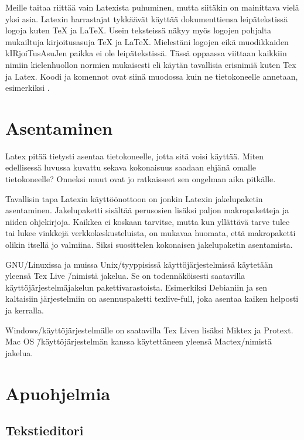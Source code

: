 Meille taitaa riittää vain Latexista puhuminen, mutta siitäkin on
mainittava vielä yksi asia. Latexin harrastajat tykkäävät käyttää
dokumenttiensa leipätekstissä logoja kuten \TeX{} ja \LaTeX{}. Usein
teksteissä näkyy myös logojen pohjalta mukailtuja kir\-joi\-tus\-asu\-ja
TeX ja LaTeX. Mielestäni logojen eikä muodikkaiden
kIR\-joi\-Tus\-Asu\-Jen paikka ei ole leipätekstissä. Tässä oppaassa
viittaan kaikkiin nimiin kielenhuollon normien mukaisesti eli käytän
tavallisia erisnimiä kuten Tex ja Latex. Koodi ja komennot ovat siinä
muodossa kuin ne tietokoneelle annetaan, esimerkiksi .

\section{Asentaminen}
\label{luku:asentaminen}

Latex pitää tietysti asentaa tietokoneelle, jotta sitä voisi käyttää.
Miten edellisessä luvussa kuvattu sekava kokonaisuus saadaan ehjänä
omalle tietokoneelle? Onneksi muut ovat jo ratkaisseet sen ongelman aika
pitkälle.

Tavallisin tapa Latexin käyttöön\-ottoon on jonkin Latexin jakelupaketin
asentaminen. Jakelupaketti sisältää perus\-osien lisäksi paljon
makropaketteja ja niiden ohjekirjoja. Kaikkea ei koskaan tarvitse, mutta
kun yllättävä tarve tulee tai lukee vinkkejä verkkokeskusteluista, on
mukavaa huomata, että makropaketti olikin itsellä jo valmiina. Siksi
suosittelen kokonaisen jakelupaketin asentamista.

GNU/Linuxissa ja muissa Unix\-/tyyppisissä käyttöjärjestelmissä
käytetään yleensä Tex Live \=/nimistä jakelua. Se on todennäköisesti
saatavilla käyttöjärjestelmäjakelun pakettivarastoista. Esimerkiksi
Debianiin ja sen kaltaisiin järjestelmiin on asennuspaketti
texlive-full, joka asentaa kaiken helposti ja kerralla.

Windows\-/käyttöjärjestelmälle on saatavilla Tex Liven lisäksi Miktex ja
Protext. Mac OS \=/käyttöjärjestelmän kanssa käytettäneen yleensä
Mactex\-/nimistä jakelua.

\section{Apuohjelmia}

\subsection{Tekstieditori}

